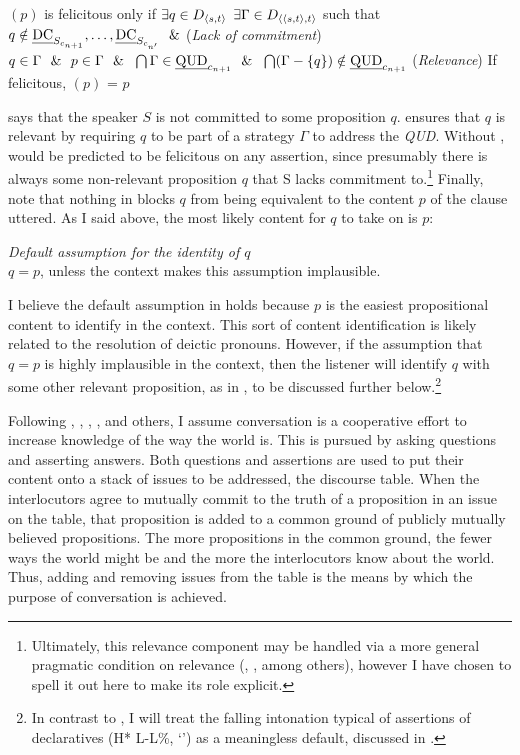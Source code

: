 \documentclass[output=paper,colorlinks,citecolor=brown]{langscibook}
\begin{document}
	\exa \label{riseden}
	$(p)$ is felicitous only if $\exists q \in D_{{\langle s,t \rangle}}$  $\exists \Gamma \in D_{{\langle {\langle s,t \rangle},t \rangle}}$  such that 
	\ea $q \notin  \text{\em DC}_{S_{c_{n+1}}},\dots,\text{\em DC}_{S_{c_{n'}}} ~~\&$ \hfill \label{riseCom}(\emph{Lack of commitment})
	\ex $q \in \Gamma ~~\&~~ p \in \Gamma ~~\&~~ \bigcap \Gamma \in \text{\em QUD}_{c_{n+1}} ~~\&~~ \bigcap(\Gamma-\{q\}) \notin \text{\em QUD}_{c_{n+1}}$ \hfill \label{riseRel}(\emph{Relevance})
	\z
	If felicitous, $(p)$ = $p$
	\z
	
	 says that the speaker $S$ is not committed to some proposition $q$.  ensures that $q$ is relevant by requiring $q$ to be part of a strategy $\Gamma$ to address the \emph{QUD}. Without , \rise would be predicted to be felicitous on any assertion, since presumably there is always some non-relevant proposition $q$ that S lacks commitment to.\footnote{Ultimately, this relevance component may be handled via a more general pragmatic condition on relevance (\citealt{grice89:lc}, \citealt{roberts12}, among others), however I have chosen to spell it out here to make its role explicit.} Finally, note that nothing in  blocks $q$ from being equivalent to the content $p$ of the clause uttered. As I said above, the most likely content for $q$ to take on is $p$:
	
	\exa \emph{Default assumption for the identity of $q$}\\
	$q = p$, unless the context makes this assumption implausible. \label{default}
	\z
	
	I believe the default assumption in  holds because $p$ is the easiest propositional content to identify in the context. This sort of content identification is likely related to the resolution of deictic pronouns. However, if the assumption that $q = p$ is highly implausible in the context, then the listener will identify $q$ with some other relevant proposition, as in , to be discussed further below.\footnote{In contrast to \rise, I will treat the falling intonation typical of assertions of declaratives (H* L-L\%, `\fall') as a meaningless default, discussed in .}
	
	Following \citet{stalnaker78}, \citet{lewis79}, \citet{roberts12}, \citet{farkas10}, and others, I assume conversation is a cooperative effort to increase knowledge of the way the world is. This is pursued by asking questions and asserting answers. Both questions and assertions are used to put their content onto a stack of issues to be addressed, the discourse table. When the interlocutors agree to mutually commit to the truth of a proposition in an issue on the table, that proposition is added to a common ground of publicly mutually believed propositions. The more propositions in the common ground, the fewer ways the world might be and the more the interlocutors know about the world. Thus, adding and removing issues from the table is the means by which the purpose of conversation is achieved.
	
\end{document}

